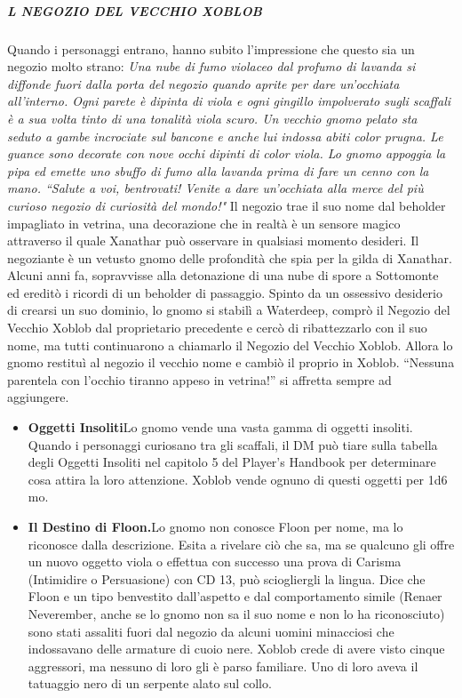\documentclass{article}
\begin{document}
\subparagraph{L NEGOZIO DEL VECCHIO XOBLOB}Quando i personaggi entrano, hanno subito l'impressione che questo sia un negozio molto strano:\newline
\textit{Una nube di fumo violaceo dal profumo di lavanda si diffonde fuori dalla porta del negozio quando aprite per dare un'occhiata all'interno. Ogni parete è dipinta di viola e ogni gingillo impolverato sugli scaffali è a sua volta tinto di una tonalità viola scuro. Un vecchio gnomo pelato sta seduto a gambe incrociate sul bancone e anche lui indossa abiti color prugna. Le guance sono decorate con nove occhi dipinti di color viola. 
Lo gnomo appoggia la pipa ed emette uno sbuffo di fumo alla lavanda prima di fare un cenno con la mano. 
“Salute a voi, bentrovati! Venite a dare un'occhiata alla merce del più curioso negozio di curiosità del mondo!"}\newline
Il negozio trae il suo nome dal beholder impagliato in vetrina, una decorazione che in realtà è un sensore magico attraverso il quale Xanathar può osservare in qualsiasi momento desideri. 
Il negoziante è un vetusto gnomo delle profondità che spia per la gilda di Xanathar. Alcuni anni fa, sopravvisse alla detonazione di una nube di spore a Sottomonte ed ereditò i ricordi di un beholder di passaggio. Spinto da un ossessivo desiderio di crearsi un suo dominio, lo gnomo si stabilì a Waterdeep, comprò il Negozio del Vecchio Xoblob dal proprietario precedente e cercò di ribattezzarlo con il suo nome, ma tutti continuarono a chiamarlo il Negozio del Vecchio Xoblob. Allora lo gnomo restituì al negozio il vecchio nome e cambiò il proprio in Xoblob. “Nessuna parentela con l'occhio tiranno appeso in vetrina!” si affretta sempre ad aggiungere.\newline
\begin{itemize}
    \item \textbf{Oggetti Insoliti}Lo gnomo vende una vasta gamma di oggetti insoliti. Quando i personaggi curiosano tra gli scaffali, il DM può tiare sulla tabella degli Oggetti Insoliti nel capitolo 5 del Player's Handbook per determinare cosa attira la loro attenzione. Xoblob vende ognuno di questi oggetti per 1d6 mo.
  \item \textbf{Il Destino di Floon.}Lo gnomo non conosce Floon per nome, ma lo riconosce dalla descrizione. Esita a rivelare ciò che sa, ma se qualcuno gli offre un nuovo oggetto viola o effettua con successo una prova di Carisma (Intimidire o Persuasione) con CD 13, può sciogliergli la lingua. Dice che Floon e un tipo benvestito dall'aspetto e dal comportamento simile (Renaer Neverember, anche se lo gnomo non sa il suo nome e non lo ha riconosciuto) sono stati assaliti fuori dal negozio da alcuni uomini minacciosi che indossavano delle armature di cuoio nere. Xoblob crede di avere visto cinque aggressori, ma nessuno di loro gli è parso familiare. Uno di loro aveva il tatuaggio nero di un serpente alato sul collo.
\end{itemize}
\end{document}
